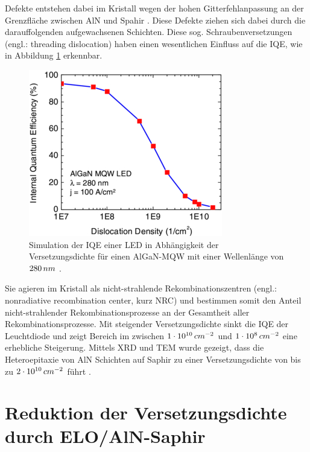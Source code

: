 Defekte entstehen dabei im Kristall wegen der hohen Gitterfehlanpassung an der Grenzfläche zwischen AlN und Spahir \cite{pohl}. Diese Defekte ziehen sich dabei durch die darauffolgenden aufgewachsenen Schichten. Diese sog. Schraubenversetzungen (engl.: threading dislocation) haben einen wesentlichen Einfluss auf die IQE, wie in Abbildung \ref{fig:IQEthreadingdisl} erkennbar. 
%
\begin{figure}[h]
\centering
\begin{minipage}[t]{1\linewidth}
\centering
\includegraphics[width=0.5\linewidth]{Bilder/IQEthreadingdisl.PNG}
\end{minipage}%
\caption{Simulation der IQE einer LED in Abhängigkeit der Versetzungsdichte für einen AlGaN-MQW mit einer Wellenlänge von $280 \thinspace nm$ \cite{0268-1242-26-1-014036}.}
 \label{fig:IQEthreadingdisl}
\end{figure}
\noindent
Sie agieren im Kristall als nicht-strahlende Rekombinationszentren (engl.: nonradiative recombination center, kurz NRC) und bestimmen somit den Anteil nicht-strahlender Rekombinationsprozesse an der Gesamtheit aller Rekombinationsprozesse.
\newline
Mit steigender Versetzungsdichte sinkt die IQE der Leuchtdiode und zeigt Bereich im  zwischen $1\cdot 10^{10} \thinspace cm^{-2}$ und $1\cdot 10^8 \thinspace cm^{-2}$ eine erhebliche Steigerung. Mittels XRD und TEM wurde gezeigt, dass die Heteroepitaxie von AlN Schichten auf Saphir zu einer Versetzungsdichte von bis zu $2\cdot 10^{10} \thinspace cm^{-2}$ führt \cite{zeimeru}.

\section{Reduktion der Versetzungsdichte durch ELO/AlN-Saphir}

